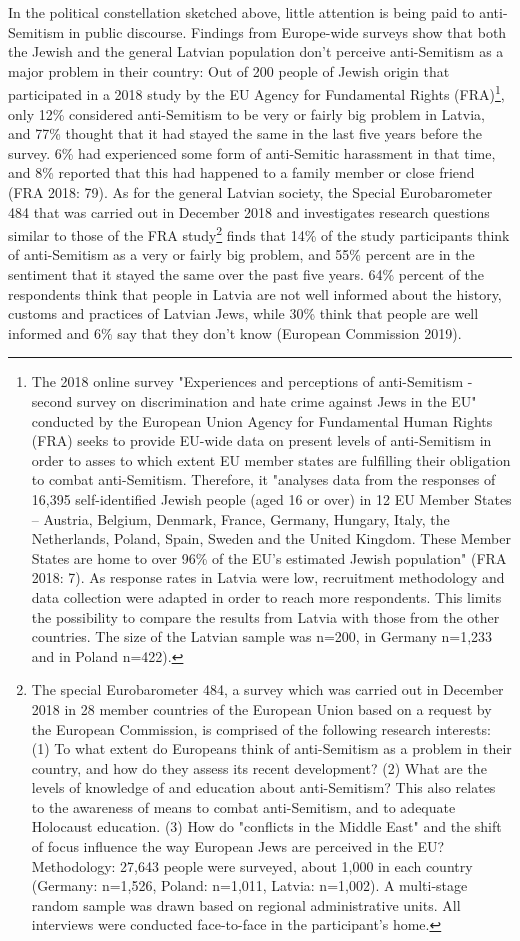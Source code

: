 In the political constellation sketched above, little attention is being paid to anti-Semitism in public discourse. Findings from Europe-wide surveys show that both the Jewish and the general Latvian population don't perceive anti-Semitism as a major problem in their country: Out of 200 people of Jewish origin that participated in a 2018 study by the EU Agency for Fundamental Rights (FRA)\footnote{The 2018 online survey "Experiences and perceptions of anti-Semitism - second survey on discrimination and hate crime against Jews in the EU" conducted by the European Union Agency for Fundamental Human Rights (FRA) seeks to provide EU-wide data on present levels of anti-Semitism in order to asses to which extent EU member states are fulfilling their obligation to combat anti-Semitism. Therefore, it "analyses data from the responses of 16,395 self-identified Jewish people (aged 16 or over) in 12 EU Member States – Austria, Belgium, Denmark, France, Germany, Hungary, Italy, the Netherlands, Poland, Spain, Sweden and the United Kingdom. These Member States are home to over 96\% of the EU’s estimated Jewish population" (FRA 2018: 7). As response rates in Latvia were low, recruitment methodology and data collection were adapted in order to reach more respondents. This limits the possibility to compare the results from Latvia with those from the other countries. The size of the Latvian sample was n=200, in Germany n=1,233 and in Poland n=422).}, only 12\% considered anti-Semitism to be very or fairly big problem in Latvia, and 77\% thought that it had stayed the same in the last five years before the survey. 6\% had experienced some form of anti-Semitic harassment in that time, and 8\% reported that this had happened to a family member or close friend (FRA 2018: 79). As for the general Latvian society, the Special Eurobarometer 484 that was carried out in December 2018 and investigates research questions similar to those of the FRA study\footnote{The special Eurobarometer 484, a survey which was carried out in December 2018 in 28 member countries of the European Union based on a request by the European Commission, is comprised of the following research interests: (1) To what extent do Europeans think of anti-Semitism as a problem in their country, and how do they assess its recent development? (2) What are the levels of knowledge of and education about anti-Semitism? This also relates to the awareness of means to combat anti-Semitism, and to adequate Holocaust education. (3) How do "conflicts in the Middle East" and the shift of focus influence the way European Jews are perceived in the EU? Methodology: 27,643 people were surveyed, about 1,000 in each country (Germany: n=1,526, Poland: n=1,011, Latvia: n=1,002). A multi-stage random sample was drawn based on regional administrative units. All interviews were conducted face-to-face in the participant’s home.} finds that 14\% of the study participants think of anti-Semitism as a very or fairly big problem, and 55\% percent are in the sentiment that it stayed the same over the past five years. 64\% percent of the respondents think that people in Latvia are not well informed about the history, customs and practices of Latvian Jews, while 30\% think that people are well informed and 6\% say that they don't know (European Commission 2019). 